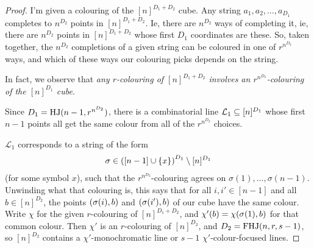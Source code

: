 \begin{proof}
I'm given a colouring of the $[n]^{D_1 + D_2}$ cube. Any string $a_1, a_2, \ldots, a_{D_1}$ completes to $n^{D_2}$ points in $[n]^{D_1 + D_2}$. Ie, there are $n^{D_2}$ ways of completing it, ie, there are $n^{D_2}$ points in $[n]^{D_1 + D_2}$ whose first $D_1$ coordinates are these. So, taken together, the $n^{D_2}$ completions of a given string can be coloured in one of $r^{n^{D_2}}$ ways, and which of these ways our colouring picks depends on the string.

In fact, we observe that \textit{any $r$-colouring of $[n]^{D_1 + D_2}$ involves an $r^{n^{D_2}}$-colouring of the $[n]^{D_1}$ cube.}

Since $D_1 = \operatorname{HJ}(n - 1, r^{n^{D_2}})$, there is a combinatorial line $\mathcal{L}_1 \subseteq [n]^{D_1}$ whose first $n - 1$ points all get the same colour from all of the $r^{n^{D_2}}$ choices.

$\mathcal{L}_1$ corresponds to a string of the form
\begin{align*}
    \sigma \in \left( \left[ n - 1 \right] \cup \left\{ x \right\} \right)^{D_1} \setminus [n]^{D_1}
\end{align*}
(for some symbol $x$), such that the $r^{n^{D_2}}$-colouring agrees on $\sigma(1), \ldots, \sigma(n - 1)$.
Unwinding what that colouring is, this says that for all $i, i' \in [n - 1]$ and all $b \in [n]^{D_2}$, the points $\left( \sigma(i), b \right)$ and $\left( \sigma(i'), b \right)$ of our cube have the same colour. Write $\chi$ for the given $r$-colouring of $[n]^{D_1 + D_2}$, and $\chi'(b) = \chi\!\left( \sigma(1), b \right)$ for that common colour. Then $\chi'$ is an $r$-colouring of $[n]^{D_2}$, and $D_2 = \operatorname{FHJ}(n, r, s - 1)$, so $[n]^{D_2}$ contains a $\chi'$-monochromatic line or $s - 1$ $\chi'$-colour-focused lines.


\end{proof}

